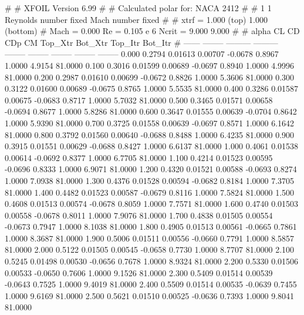 #  
#       XFOIL         Version 6.99
#  
# Calculated polar for: NACA 2412                                       
#  
# 1 1 Reynolds number fixed          Mach number fixed         
#  
# xtrf =   1.000 (top)        1.000 (bottom)  
# Mach =   0.000     Re =     0.105 e 6     Ncrit =   9.000  9.000
#  
#   alpha    CL        CD       CDp       CM     Top_Xtr  Bot_Xtr  Top_Itr  Bot_Itr
#  ------ -------- --------- --------- -------- -------- -------- -------- --------
   0.000   0.2794   0.01613   0.00707  -0.0678   0.8967   1.0000   4.9154  81.0000
   0.100   0.3016   0.01599   0.00689  -0.0697   0.8940   1.0000   4.9996  81.0000
   0.200   0.2987   0.01610   0.00699  -0.0672   0.8826   1.0000   5.3606  81.0000
   0.300   0.3122   0.01600   0.00689  -0.0675   0.8765   1.0000   5.5535  81.0000
   0.400   0.3286   0.01587   0.00675  -0.0683   0.8717   1.0000   5.7032  81.0000
   0.500   0.3465   0.01571   0.00658  -0.0694   0.8677   1.0000   5.8286  81.0000
   0.600   0.3647   0.01555   0.00639  -0.0704   0.8642   1.0000   5.9390  81.0000
   0.700   0.3725   0.01558   0.00639  -0.0697   0.8571   1.0000   6.1642  81.0000
   0.800   0.3792   0.01560   0.00640  -0.0688   0.8488   1.0000   6.4235  81.0000
   0.900   0.3915   0.01551   0.00629  -0.0688   0.8427   1.0000   6.6137  81.0000
   1.000   0.4061   0.01538   0.00614  -0.0692   0.8377   1.0000   6.7705  81.0000
   1.100   0.4214   0.01523   0.00595  -0.0696   0.8333   1.0000   6.9071  81.0000
   1.200   0.4320   0.01521   0.00588  -0.0693   0.8274   1.0000   7.0938  81.0000
   1.300   0.4376   0.01528   0.00594  -0.0682   0.8184   1.0000   7.3705  81.0000
   1.400   0.4482   0.01523   0.00587  -0.0679   0.8116   1.0000   7.5824  81.0000
   1.500   0.4608   0.01513   0.00574  -0.0678   0.8059   1.0000   7.7571  81.0000
   1.600   0.4740   0.01503   0.00558  -0.0678   0.8011   1.0000   7.9076  81.0000
   1.700   0.4838   0.01505   0.00554  -0.0673   0.7947   1.0000   8.1038  81.0000
   1.800   0.4905   0.01513   0.00561  -0.0665   0.7861   1.0000   8.3687  81.0000
   1.900   0.5006   0.01511   0.00556  -0.0660   0.7791   1.0000   8.5857  81.0000
   2.000   0.5122   0.01505   0.00545  -0.0658   0.7730   1.0000   8.7707  81.0000
   2.100   0.5245   0.01498   0.00530  -0.0656   0.7678   1.0000   8.9324  81.0000
   2.200   0.5330   0.01506   0.00533  -0.0650   0.7606   1.0000   9.1526  81.0000
   2.300   0.5409   0.01514   0.00539  -0.0643   0.7525   1.0000   9.4019  81.0000
   2.400   0.5509   0.01514   0.00535  -0.0639   0.7455   1.0000   9.6169  81.0000
   2.500   0.5621   0.01510   0.00525  -0.0636   0.7393   1.0000   9.8041  81.0000
